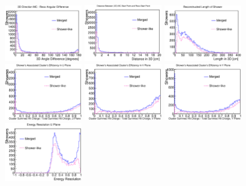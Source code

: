 \begin{figure}[htbp]
\begin{center}
\includegraphics[width=0.3\textwidth]{figs/ongoing/eminus/AngleDiff.eps}
\includegraphics[width=0.3\textwidth]{figs/ongoing/eminus/StartingPointAcc.eps}
\includegraphics[width=0.3\textwidth]{figs/ongoing/eminus/Length.eps}
\includegraphics[width=0.3\textwidth]{figs/ongoing/eminus/ClusterEffU.eps}
\includegraphics[width=0.3\textwidth]{figs/ongoing/eminus/ClusterEffV.eps}
\includegraphics[width=0.3\textwidth]{figs/ongoing/eminus/ClusterEffY.eps}
\includegraphics[width=0.3\textwidth]{figs/ongoing/eminus/EnergyResU.eps}

\end{center}
\end{figure}
